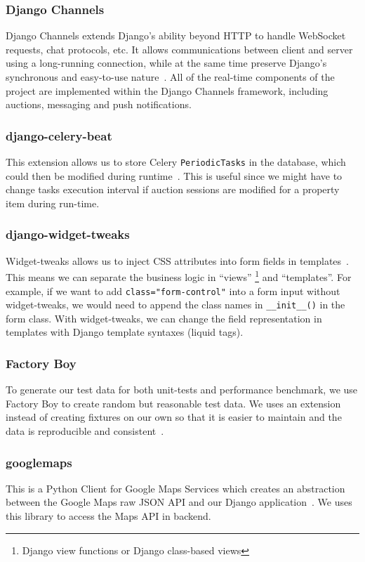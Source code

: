 \subsubsection{Django Channels}
Django Channels extends Django's ability beyond HTTP to handle WebSocket
requests, chat protocols, etc. It allows communications between client and
server using a long-running connection, while at the same time preserve Django's
synchronous and easy-to-use nature~\cite{django-channels-doc}. All of the
real-time components of the project are implemented within the Django Channels
framework, including auctions, messaging and push notifications.

\subsubsection{django-celery-beat}
This extension allows us to store Celery \texttt{PeriodicTasks} in the database,
which could then be modified during
runtime~\cite{django-celery-beat-doc}. This is useful since we
might have to change tasks execution interval if auction sessions are modified
for a property item during run-time.

\subsubsection{django-widget-tweaks}
Widget-tweaks allows us to inject CSS attributes into form fields in
templates~\cite{widget-tweaks}. This means we can separate the business logic
in ``views'' \footnote{Django view functions or Django class-based views} and
``templates''. For example, if we want to add \texttt{class="form-control"}
into a form input without widget-tweaks, we would need to append the class names
in \texttt{\_\_init\_\_()} in the form class. With widget-tweaks, we can change the
field representation in templates with Django template syntaxes (liquid tags).

\subsubsection{Factory Boy}
To generate our test data for both unit-tests and performance benchmark, we use
Factory Boy to create random but reasonable test data. We uses an extension
instead of creating fixtures on our own so that it is easier to maintain and the
data is reproducible and consistent~\cite{factory-boy-doc}.

\subsubsection{googlemaps}
This is a Python Client for Google Maps Services which creates an abstraction
between the Google Maps raw JSON API and our Django
application~\cite{python-google-maps}. We uses this library to access the Maps
API in backend.


